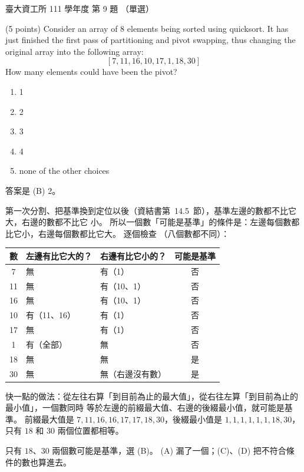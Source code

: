 \begin{pastexam}[label={px:ntu-111-dsaa-09}]{臺大資工所 111 學年度 第 9 題}
（單選）

(5 points) Consider an array of 8 elements being sorted using quicksort. It has just finished the
first pass of partitioning and pivot swapping, thus changing the original array into the
following array:
\[[7,11,16,10,17,1,18,30]\]
How many elements could have been the pivot?
\begin{enumerate}[label=(\Alph*)]
\item 1
\item 2
\item 3
\item 4
\item none of the other choices
\end{enumerate}
\end{pastexam}

\begin{pastsoln}
答案是 (B) 2。

第一次分割、把基準換到定位以後（資結書第~14.5~節），基準左邊的數都不比它大，右邊的數都不比它
小。 所以一個數「可能是基準」的條件是：左邊每個數都比它小，右邊每個數都比它大。 逐個檢查
（八個數都不同）：
\begin{center}
\begin{tabular}{cllc}
\toprule
數 & 左邊有比它大的？ & 右邊有比它小的？ & 可能是基準 \\
\midrule
7 & 無 & 有（1） & 否 \\
11 & 無 & 有（10、1） & 否 \\
16 & 無 & 有（10、1） & 否 \\
10 & 有（11、16） & 有（1） & 否 \\
17 & 無 & 有（1） & 否 \\
1 & 有（全部） & 無 & 否 \\
18 & 無 & 無 & 是 \\
30 & 無 & 無（右邊沒有數） & 是 \\
\bottomrule
\end{tabular}
\end{center}
快一點的做法：從左往右算「到目前為止的最大值」，從右往左算「到目前為止的最小值」，一個數同時
等於左邊的前綴最大值、右邊的後綴最小值，就可能是基準。 前綴最大值是 $7, 11, 16, 16, 17, 17,
18, 30$，後綴最小值是 $1, 1, 1, 1, 1, 1, 18, 30$，只有 $18$ 和 $30$ 兩個位置都相等。

只有 $18$、$30$ 兩個數可能是基準，選 (B)。 (A) 漏了一個；(C)、(D) 把不符合條件的數也算進去。
\end{pastsoln}
